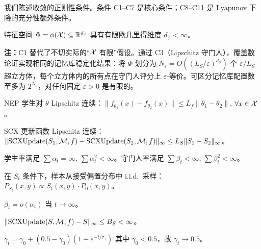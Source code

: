 我们陈述收敛的正则性条件。条件 C1--C7 是核心条件；C8--C11 是 Lyapunov 下降的充分性额外条件。

\begin{assumption}[C1: 有限覆盖维度]\label{ass:c1}
特征空间 $\Phi = \phi(\mathcal{X}) \subseteq \mathbb{R}^{d_\phi}$ 具有有限欧几里得维度 $d_\phi < \infty$。
\end{assumption}

\textbf{注：}C1 替代了不切实际的``$\mathcal{X}$ 有限''假设。通过 C3（Lipschitz 守门人），覆盖数论证实现相同的记忆库稳定化结果：将 $\Phi$ 划分为 $N_\varepsilon = O((L_S/\varepsilon)^{d_\phi})$ 个 $\varepsilon/L_S$-超立方体，每个立方体内的所有点在守门人评分上 $\varepsilon$-等价。可区分记忆库配置数至多为 $2^{N_\varepsilon}$，对任何固定 $\varepsilon > 0$ 是有限的。

\begin{assumption}[C2: Lipschitz 学生]\label{ass:c2}
NEP 学生对 $\theta$ Lipschitz 连续：$\|f_{\theta_1}(x) - f_{\theta_2}(x)\| \leq L_f \|\theta_1 - \theta_2\|$, $\forall x \in \mathcal{X}$。
\end{assumption}

\begin{assumption}\label{ass:c3}
SCX 更新函数 Lipschitz 连续：$\|\text{SCXUpdate}(S_1, \mathcal{M}, f) - \text{SCXUpdate}(S_2, \mathcal{M}, f)\|_\infty \leq L_S \|S_1 - S_2\|_\infty$。
\end{assumption}

\begin{assumption}[C4: 学习率]\label{ass:c4}
学生率满足 $\sum \alpha_t = \infty$, $\sum \alpha_t^2 < \infty$。守门人率满足 $\sum \beta_t < \infty$, $\sum \beta_t^2 < \infty$。
\end{assumption}

\begin{assumption}[C5: 条件 i.i.d.\ 采样]\label{ass:c5}
在 $S_t$ 条件下，样本从接受偏置分布中 i.i.d.\ 采样：$P_{S_t}(x,y) \propto S_t(x,y) \cdot P_0(x,y)$。
\end{assumption}

\begin{assumption}[C6: 双时间尺度分离]\label{ass:c6}
$\beta_t = o(\alpha_t)$ 当 $t \to \infty$。
\end{assumption}

\begin{assumption}[C7: 有界守门人更新]\label{ass:c7}
$\|\text{SCXUpdate}(S, \mathcal{M}, f) - S\|_\infty \leq B_S < \infty$。
\end{assumption}

\begin{assumption}\label{ass:c8}
$\gamma_t = \gamma_0 + (0.5 - \gamma_0)(1 - e^{-t/\tau_\gamma})$ 其中 $\gamma_0 < 0.5$，故 $\gamma_t \to 0.5$。
\end{assumption}

